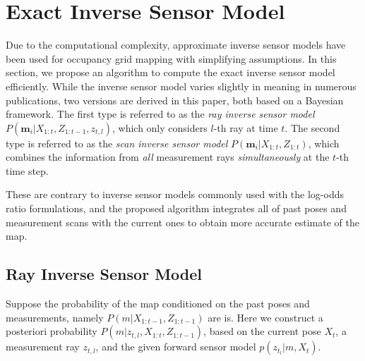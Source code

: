 \documentclass[letterpaper, 10pt, conference]{ieeeconf}
\begin{document}
	
	
\section{Exact Inverse Sensor Model}
\label{sec:ISM}

Due to the computational complexity, approximate inverse sensor models have been used for occupancy grid mapping with simplifying assumptions. In this section, we propose an algorithm to compute the exact inverse sensor model efficiently. 
While the inverse sensor model varies slightly in meaning in numerous publications, two versions are derived in this paper, both based on a Bayesian framework.
The first type is referred to as the \emph{ray inverse sensor model} $P(\mathbf{m}_i|X_{1:t},Z_{1:t-1},z_{t,l})$, which only considers $l$-th ray at time $t$.
The second type is referred to as the \emph{scan inverse sensor model} $P(\mathbf{m}_i|X_{1:t},Z_{1:t})$, which combines the information from \emph{all} measurement rays \emph{simultaneously} at the $t$-th time step.


These are contrary to inverse sensor models commonly used with the log-odds ratio formulations, and the proposed algorithm integrates all of past poses and measurement scans with the current ones to obtain more accurate estimate of the map.

\subsection{Ray Inverse Sensor Model}

Suppose the probability of the map conditioned on the past poses and measurements, namely $P(m|X_{1:t-1},Z_{1:t-1})$ are is. Here we construct a posteriori probability $P(m|z_{t,l},X_{1:t},Z_{1:t-1})$, based on the current pose $X_t$, a measurement ray $z_{t,l}$, and the given forward sensor model $p(z_{t_l}|m,X_t)$.
\end{document}
